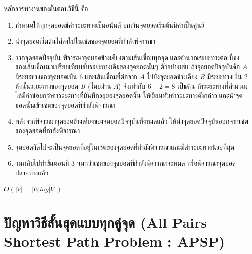 หลักการทำงานของขั้นตอนวิธีนี้ คือ
\begin{enumerate}
\item กำหนดให้ทุกจุดยอดมีค่าระยะทางเป็นอนันต์ ยกเว้นจุดยอดเริ่มต้นมีค่าเป็นศูนย์
\item นำจุดยอดเริ่มต้นใส่ลงไปในเซตของจุดยอดที่กำลังพิจารณา
\item จากจุดยอดปัจจุบัน พิจารณาจุดยอดข้างเคียงตามเส้นเชื่อมทุกจุด และคำนวณระยะทางต่อเนื่องของเส้นเชื่อมมาเปรียบเทียบกับระยะทางเดิมของจุดยอดนั้นๆ ตัวอย่างเช่น ถ้าจุดยอดปัจจุบันคือ $A$ มีระยะทางของจุดยอดเป็น 6 และเส้นเชื่อมที่ต่อจาก $A$ ไปยังจุดยอดข้างเคียง $B$ มีระยะทางเป็น 2 ดังนั้นระยะทางของจุดยอด $B$ (โดยผ่าน $A$) จึงเท่ากับ $6+2 = 8$ เป็นต้น ถ้าระยะทางที่คำนวณได้มีค่าน้อยกว่าค่าระยะทางที่บันทึกอยู่ของจุดยอดนั้น ให้เขียนทับค่าระยะทางดังกล่าว และนำจุดยอดนั้นเข้าเซตของจุดยอดที่กำลังพิจารณา
\item หลังจากพิจารณาจุดยอดข้างเคียงของจุดยอดปัจจุบันทั้งหมดแล้ว ให้นำจุดยอดปัจจุบันออกจากเซตของจุดยอดที่กำลังพิจารณา
\item จุดยอดถัดไปจะเป็นจุดยอดที่อยู่ในเซตของจุดยอดที่กำลังพิจารณาและมีต่าระยะทางน้อยที่สุด
\item วนกลับไปทำขั้นตอนที่ 3 จนกว่าเซตของจุดยอดที่กำลังพิจารณาจะหมด หรือพิจารณาจุดยอดปลายทางแล้ว
\end{enumerate}
$O(|V|+|E|log|V|)$

\section{ปัญหาวิธีสั้นสุดแบบทุกคู่จุด (All Pairs Shortest Path Problem : APSP)}
